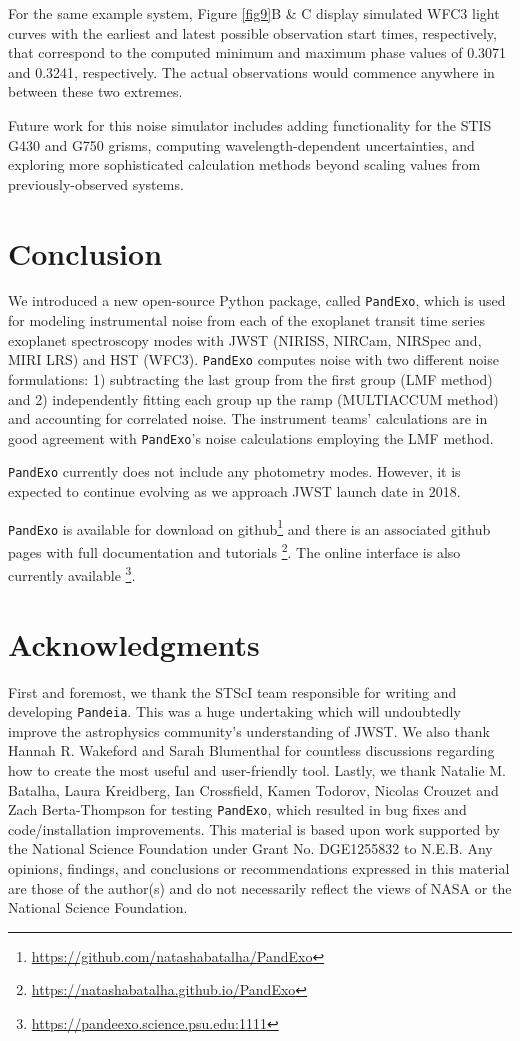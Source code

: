 \documentclass[iop]{emulateapj}
\begin{document}
For the same example system, Figure \ref{fig9}B \& C display simulated WFC3 light curves with the earliest and latest possible observation start times, respectively, that correspond to the computed minimum and maximum phase values of 0.3071 and 0.3241, respectively.  The actual observations would commence anywhere in between these two extremes.

Future work for this noise simulator includes adding functionality for the STIS G430 and G750 grisms, computing wavelength-dependent uncertainties, and exploring more sophisticated calculation methods beyond scaling values from previously-observed systems.

\section{Conclusion}
We introduced a new open-source Python package, called \texttt{PandExo}, which is used for modeling instrumental noise from each of the exoplanet transit time series exoplanet spectroscopy modes with JWST (NIRISS, NIRCam, NIRSpec and, MIRI LRS) and HST (WFC3). \texttt{PandExo} computes noise with two different noise formulations: 1) subtracting the last group from the first group (LMF method) and 2) independently fitting each group up the ramp (MULTIACCUM method) and accounting for correlated noise. The instrument teams' calculations are in good agreement with \texttt{PandExo}'s noise calculations employing the LMF method.

\texttt{PandExo} currently does not include any photometry modes. However, it is expected to continue evolving as we approach JWST launch date in 2018. 

\texttt{PandExo} is available for download on github\footnote{\url{https://github.com/natashabatalha/PandExo}} and there is an associated github pages with full documentation and tutorials \footnote{\url{https://natashabatalha.github.io/PandExo}}. The online interface is also currently available \footnote{\url{https://pandeexo.science.psu.edu:1111}}. 

\acknowledgments
\section{Acknowledgments}
First and foremost, we thank the STScI team responsible for writing and developing \texttt{Pandeia}. This was a huge undertaking which will undoubtedly improve the astrophysics community's understanding of JWST. We also thank Hannah R. Wakeford and Sarah Blumenthal for countless discussions regarding how to create the most useful and user-friendly tool. Lastly, we thank Natalie M. Batalha, Laura Kreidberg, Ian Crossfield, Kamen Todorov, Nicolas Crouzet and Zach Berta-Thompson for testing \texttt{PandExo}, which resulted in bug fixes and code/installation improvements. This material is based upon work supported by the National Science Foundation under Grant No. DGE1255832 to N.E.B. Any opinions, findings, and conclusions or recommendations expressed in this material are those of the author(s) and do not necessarily reflect the views of NASA or the National Science Foundation.
\end{document}
